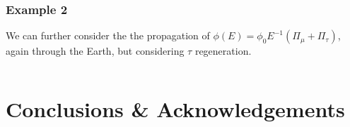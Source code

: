 \documentclass[3p,12pt,authoryear]{elsarticle}
\begin{document}
\subsubsection{Example 2}

We can further consider the the propagation of $\phi(E) = \phi_0 E^{-1} ( \Pi_\mu + \Pi_\tau )$, again through the Earth, but considering $\tau$ regeneration. 

\begin{lstlisting}[frame=leftline, numbers = left,breaklines=true]

\end{lstlisting}

\section{Conclusions \& Acknowledgements} 
\label{sec:conclu} 



\end{document}
